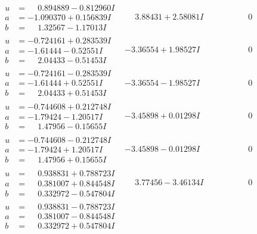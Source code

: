 \documentclass[1p]{elsarticle_modified}
\theoremstyle{definition}
\begin{document}
$$\begin{array}{c|c|c}
\begin{aligned}
u &= \phantom{-}0.894889 - 0.812960 I \\
a &= -1.090370 + 0.156839 I \\
b &= \phantom{-}1.32567 - 1.17013 I\end{aligned}
 & \phantom{-}3.88431 + 2.58081 I & \phantom{-0.000000 } 0 \\ \hline\begin{aligned}
u &= -0.724161 + 0.283539 I \\
a &= -1.61444 - 0.52551 I \\
b &= \phantom{-}2.04433 - 0.51453 I\end{aligned}
 & -3.36554 + 1.98527 I & \phantom{-0.000000 } 0 \\ \hline\begin{aligned}
u &= -0.724161 - 0.283539 I \\
a &= -1.61444 + 0.52551 I \\
b &= \phantom{-}2.04433 + 0.51453 I\end{aligned}
 & -3.36554 - 1.98527 I & \phantom{-0.000000 } 0 \\ \hline\begin{aligned}
u &= -0.744608 + 0.212748 I \\
a &= -1.79424 - 1.20517 I \\
b &= \phantom{-}1.47956 - 0.15655 I\end{aligned}
 & -3.45898 + 0.01298 I & \phantom{-0.000000 } 0 \\ \hline\begin{aligned}
u &= -0.744608 - 0.212748 I \\
a &= -1.79424 + 1.20517 I \\
b &= \phantom{-}1.47956 + 0.15655 I\end{aligned}
 & -3.45898 - 0.01298 I & \phantom{-0.000000 } 0 \\ \hline\begin{aligned}
u &= \phantom{-}0.938831 + 0.788723 I \\
a &= \phantom{-}0.381007 + 0.844548 I \\
b &= \phantom{-}0.332972 - 0.547804 I\end{aligned}
 & \phantom{-}3.77456 - 3.46134 I & \phantom{-0.000000 } 0 \\ \hline\begin{aligned}
u &= \phantom{-}0.938831 - 0.788723 I \\
a &= \phantom{-}0.381007 - 0.844548 I \\
b &= \phantom{-}0.332972 + 0.547804 I\end{aligned}

\end{array}$$
\end{document}
